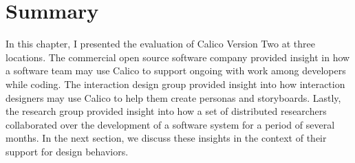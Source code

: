 

\section{Summary}
\label{chapter:evaluation:summary}

In this chapter, I presented the evaluation of Calico Version Two at three locations. The commercial open source software company provided insight in how a software team may use Calico to support ongoing with work among developers while coding. The interaction design group provided insight into how interaction designers may use Calico to help them create personas and storyboards. Lastly, the research group provided insight into how a set of distributed researchers collaborated over the development of a software system for a period of several months. In the next section, we discuss these insights in the context of their support for design behaviors.

